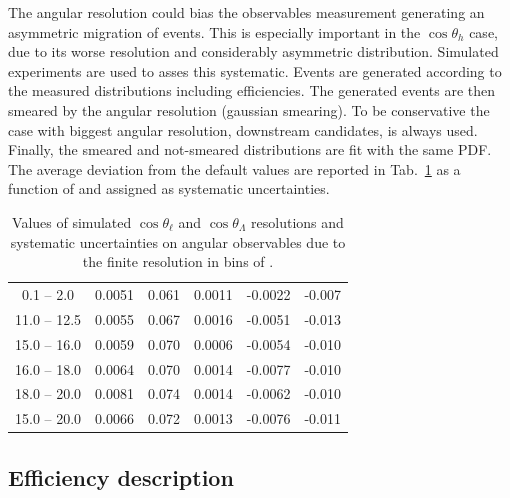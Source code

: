 The angular resolution could bias the observables measurement 
generating an asymmetric migration of events.
This is especially important in the $\cos \theta_h$ case, due to its worse resolution
and considerably asymmetric distribution. Simulated experiments are used to asses this systematic.
Events are generated according to the measured distributions including efficiencies.
The generated events are then smeared by the angular resolution (gaussian smearing).
To be conservative the case with biggest angular resolution, downstream candidates, is always used.
Finally, the smeared and not-smeared distributions are fit with the same PDF.  
The average deviation from the default values are reported in Tab.~\ref{tab:resolSys}
as a function of \qsq and assigned as systematic uncertainties.
%
\begin{table}[h]
\centering
\caption{Values of simulated $\cos\theta_\ell$ and $\cos\theta_\Lambda$ 
resolutions and systematic uncertainties on angular observables due to
the finite resolution in bins of \qsq.}
\begin{tabular}{c|ccccc}
 \boldmath{ \qsq [\gevgevcccc] } &  \boldmath{ $\sigma_\ell$ }    &  \boldmath{ $\sigma_\Lambda$}   & \boldmath{ $\Delta \afbl$} &  \boldmath{ $\Delta \fl$} & \boldmath{ $\Delta \afbh$ } \\ \hline
\phantom{x}0.1 -- 2.0\phantom{x}  & 0.0051 & 0.061 & 0.0011 & -0.0022 & -0.007 \\ 
11.0 -- 12.5 & 0.0055 & 0.067 & 0.0016 & -0.0051 & -0.013 \\
15.0 -- 16.0 & 0.0059 & 0.070 & 0.0006 & -0.0054 & -0.010 \\
16.0 -- 18.0 & 0.0064 & 0.070 & 0.0014 & -0.0077 & -0.010 \\
18.0 -- 20.0 & 0.0081 & 0.074 & 0.0014 & -0.0062 & -0.010 \\
\hline
15.0 -- 20.0 & 0.0066 & 0.072 & 0.0013 & -0.0076 & -0.011 \\
\end{tabular}
\label{tab:resolSys}
\end{table}


\subsection{Efficiency description}

